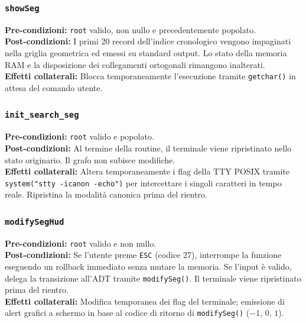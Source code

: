 \documentclass[12pt, a4paper]{article}
\begin{document}
\subsubsection{\texttt{showSeg}}
\vspace{3mm}
\begin{specbox}
\textbf{Pre-condizioni:} \texttt{root} valido, non nullo e precedentemente popolato. \\
\textbf{Post-condizioni:} I primi 20 record dell'indice cronologico vengono impaginati nella griglia geometrica ed emessi su standard output. Lo stato della memoria RAM e la disposizione dei collegamenti ortogonali rimangono inalterati. \\
\textbf{Effetti collaterali:} Blocca temporaneamente l'esecuzione tramite \texttt{getchar()} in attesa del comando utente.
\end{specbox}

\subsubsection{\texttt{init\_search\_seg}}
\vspace{3mm}
\begin{specbox}
\textbf{Pre-condizioni:} \texttt{root} valido e popolato. \\
\textbf{Post-condizioni:} Al termine della routine, il terminale viene ripristinato nello stato originario. Il grafo non subisce modifiche. \\
\textbf{Effetti collaterali:} Altera temporaneamente i flag della TTY POSIX tramite \texttt{system("stty -icanon -echo")} per intercettare i singoli caratteri in tempo reale. Ripristina la modalità canonica prima del rientro.
\end{specbox}

\subsubsection{\texttt{modifySegHud}}
\vspace{3mm}
\begin{specbox}
\textbf{Pre-condizioni:} \texttt{root} valido e non nullo. \\
\textbf{Post-condizioni:} Se l'utente preme \texttt{ESC} (codice 27), interrompe la funzione eseguendo un rollback immediato senza mutare la memoria. Se l'input è valido, delega la transizione all'ADT tramite \texttt{modifySeg()}. Il terminale viene ripristinato prima del rientro. \\
\textbf{Effetti collaterali:} Modifica temporanea dei flag del terminale; emissione di alert grafici a schermo in base al codice di ritorno di \texttt{modifySeg()} ($-1$, $0$, $1$).
\end{specbox}
\end{document}
